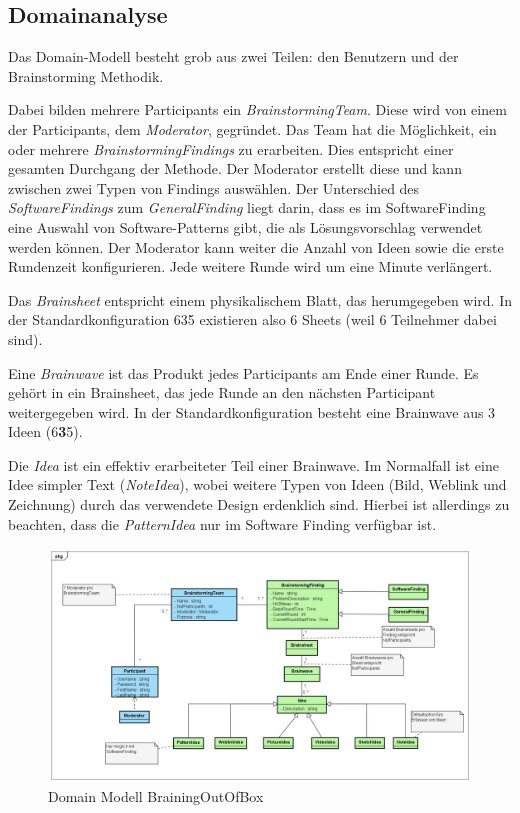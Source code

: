 \subsection{Domainanalyse}

Das Domain-Modell besteht grob aus zwei Teilen: den Benutzern und der Brainstorming Methodik. 

Dabei bilden mehrere Participants ein \textit{BrainstormingTeam}. Diese wird von einem der Participants, dem \textit{Moderator}, gegründet.  Das Team hat die Möglichkeit, ein oder mehrere \textit{BrainstormingFindings} zu erarbeiten. Dies entspricht einer gesamten Durchgang der Methode. Der Moderator erstellt diese und kann zwischen zwei Typen von Findings auswählen. Der Unterschied des \textit{SoftwareFindings} zum \textit{GeneralFinding} liegt darin, dass es im SoftwareFinding eine Auswahl von Software-Patterns gibt, die als Lösungsvorschlag verwendet werden können. Der Moderator kann weiter die Anzahl von Ideen sowie die erste Rundenzeit konfigurieren. Jede weitere Runde wird um eine Minute verlängert.

Das \textit{Brainsheet} entspricht einem physikalischem Blatt, das herumgegeben wird. In der Standardkonfiguration 635 existieren also 6 Sheets (weil 6 Teilnehmer dabei sind).

Eine \textit{Brainwave} ist das Produkt jedes Participants am Ende einer Runde. Es gehört in ein Brainsheet, das jede Runde an den nächsten Participant weitergegeben wird. In der Standardkonfiguration besteht eine Brainwave aus 3 Ideen (6\textbf{3}5).

Die \textit{Idea} ist ein effektiv erarbeiteter Teil einer Brainwave. Im Normalfall ist eine Idee simpler Text (\textit{NoteIdea}), wobei weitere Typen von Ideen (Bild, Weblink und Zeichnung) durch das verwendete Design erdenklich sind. Hierbei ist allerdings zu beachten, dass die \textit{PatternIdea} nur im Software Finding verfügbar ist.
\begin{figure}[h]
	\centering
	\includegraphics[width=1\linewidth]{img/domain-analyse/DomainModell-Methode635}
	\caption{Domain Modell BrainingOutOfBox}
	\label{fig:domainmodell-methode635}
\end{figure}
